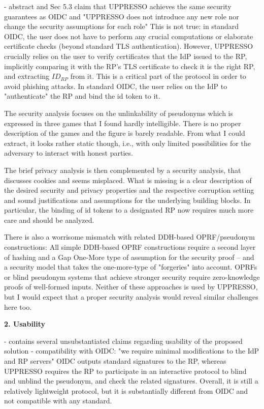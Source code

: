 \documentclass[letterpaper,onecolumn,10pt]{article}
\begin{document}
- abstract and Sec 5.3 claim that UPPRESSO achieves the same security guarantees as OIDC and "UPPRESSO does not introduce any new role nor change the security assumptions for each role"
This is not true: in standard OIDC, the user does not have to perform any crucial computations or elaborate certificate checks (beyond standard TLS authentication). However, UPPRESSO crucially relies on the user to verify certificates that the IdP issued to the RP, implicitly comparing it with the RP's TLS certificate to check it is the right RP, and extracting $ID_{RP}$ from it. This is a critical part of the protocol in order to avoid phishing attacks. In standard OIDC, the user relies on the IdP to "authenticate" the RP and bind the id token to it.


The security analysis focuses on the unlinkability of pseudonyms which is expressed in three games that I found hardly intelligible. There is no proper description of the games and the figure is barely readable. From what I could extract, it looks rather static though, i.e., with only limited possibilities for the adversary to interact with honest parties.

The brief privacy analysis is then complemented by a security analysis, that discusses cookies and seems misplaced.
What is missing is a clear description of the desired security and privacy properties and the respective corruption setting and sound justifications and assumptions for the underlying building blocks. In particular, the binding of id tokens to a designated RP now requires much more care and should be analyzed.

There is also a worrisome mismatch with related DDH-based OPRF/pseudonym constructions: All simple DDH-based OPRF constructions require a second layer of hashing and a Gap One-More type of assumption for the security proof -- and a security model that takes the one-more-type of "forgeries" into account. OPRFs or blind pseudonym systems that achieve stronger security require zero-knowledge proofs of well-formed inputs. Neither of these approaches is used by UPPRESSO, but I would expect that a proper security analysis would reveal similar challenges here too.

\noindent\textbf{2. Usability}

- contains several unsubstantiated claims regarding usability of the proposed solution
- compatibility with OIDC: "we require minimal modifications to the IdP and RP servers"
OIDC outputs standard signatures to the RP, whereas UPPRESSO requires the RP to participate in an interactive protocol to blind and unblind the pseudonym, and check the related signatures. Overall, it is still a relatively lightweight protocol, but it is substantially different from OIDC and not compatible with any standard.
\end{document}
